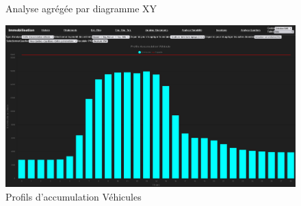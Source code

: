 \begin{landscape}
\begin{figure}
        \caption{Analyse agrégée par diagramme XY}
        \label{fig:ana-quartier-XY}
    \end{figure}
    \begin{figure}
        \centering
        \includegraphics[width=1\linewidth]{images/PAVAnaQuartier.png}
        \caption{Profils d'accumulation Véhicules}
        \label{fig:ana-quartier-PAV}
    \end{figure}
\end{landscape}